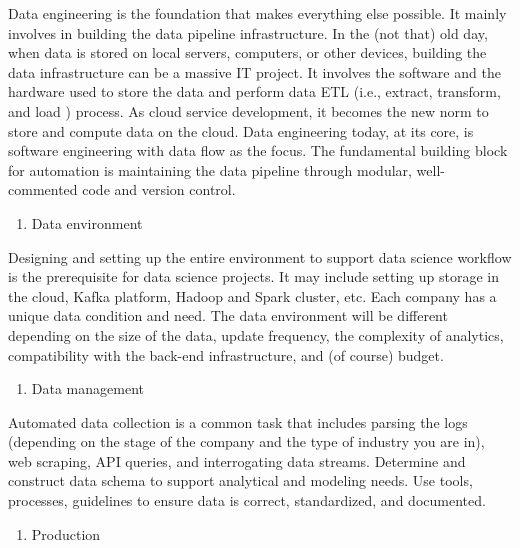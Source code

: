 \documentclass[12pt,]{krantz}
\providecommand{\tightlist}{%
  \setlength{\itemsep}{0pt}\setlength{\parskip}{0pt}}
\begin{document}
Data engineering is the foundation that makes everything else possible. It mainly involves in building the data pipeline infrastructure. In the (not that) old day, when data is stored on local servers, computers, or other devices, building the data infrastructure can be a massive IT project. It involves the software and the hardware used to store the data and perform data ETL  (i.e., extract, transform, and load ) process. As cloud service development, it becomes the new norm to store and compute data on the cloud. Data engineering today, at its core, is software engineering with data flow as the focus. The fundamental building block for automation is maintaining the data pipeline through modular, well-commented code and version control.

\begin{enumerate}
\def\labelenumi{(\arabic{enumi})}
\tightlist
\item
  Data environment
\end{enumerate}

Designing and setting up the entire environment to support data science workflow is the prerequisite for data science projects. It may include setting up storage in the cloud, Kafka  platform, Hadoop  and Spark  cluster, etc. Each company has a unique data condition and need. The data environment will be different depending on the size of the data, update frequency, the complexity of analytics, compatibility with the back-end infrastructure, and (of course) budget.

\begin{enumerate}
\def\labelenumi{(\arabic{enumi})}
\setcounter{enumi}{1}
\tightlist
\item
  Data management
\end{enumerate}

Automated data collection is a common task that includes parsing the logs (depending on the stage of the company and the type of industry you are in), web scraping, API queries, and interrogating data streams. Determine and construct data schema to support analytical and modeling needs. Use tools, processes, guidelines to ensure data is correct, standardized, and documented.

\begin{enumerate}
\def\labelenumi{(\arabic{enumi})}
\setcounter{enumi}{2}
\tightlist
\item
  Production
\end{enumerate}
\end{document}
